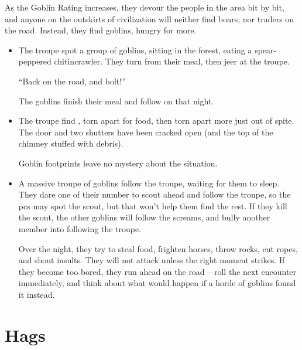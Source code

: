 \begin{multicols}{2}
As the Goblin Rating increases, they devour the people in the area bit by bit, and anyone on the outskirts of civilization will neither find boars, nor traders on the road.
Instead, they find goblins, hungry for more.


\begin{itemize}
  \item
  The troupe spot a group of goblins, sitting in the forest, eating a spear-peppered chitincrawler.
  They turn from their meal, then jeer at the troupe.

  ``Back on the road, and bolt!''

  The goblins finish their meal and follow on that night.
  \item
  The troupe find , torn apart for food, then torn apart more just out of spite.
  The door and two shutters have been cracked open (and the top of the chimney stuffed with debris).

  Goblin footprints leave no mystery about the situation.
  \item
  A massive troupe of goblins follow the troupe, waiting for them to sleep.
  They dare one of their number to scout ahead and follow the troupe, so the \glspl{pc} may spot the scout, but that won't help them find the rest.
  If they kill the scout, the other goblins will follow the screams, and bully another member into following the troupe.

  Over the night, they try to steal food, frighten horses, throw rocks, cut ropes, and shout insults.
  They will not attack unless the right moment strikes.
  If they become too bored, they run ahead on the road -- roll the next encounter immediately, and think about what would happen if a horde of goblins found it instead.
\end{itemize}

\end{multicols}

\section[Hag]{Hags}
\label{hag}

